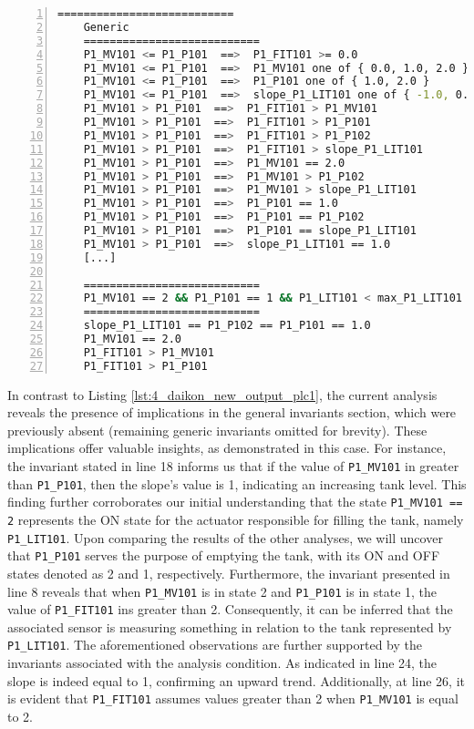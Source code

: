 \begin{lstlisting}[language=bash,numbers=left,caption={Daikon outcomes for the system configuration \texttt{P1\_MV101 == 2, P1\_P101 == 1} on \texttt{P1\_LIT101}},label=lst:4_current_system_config_analysis]
	===========================
	Generic
	===========================
	P1_MV101 <= P1_P101  ==>  P1_FIT101 >= 0.0
	P1_MV101 <= P1_P101  ==>  P1_MV101 one of { 0.0, 1.0, 2.0 }
	P1_MV101 <= P1_P101  ==>  P1_P101 one of { 1.0, 2.0 }
	P1_MV101 <= P1_P101  ==>  slope_P1_LIT101 one of { -1.0, 0.0, 1.0 }
	P1_MV101 > P1_P101  ==>  P1_FIT101 > P1_MV101
	P1_MV101 > P1_P101  ==>  P1_FIT101 > P1_P101
	P1_MV101 > P1_P101  ==>  P1_FIT101 > P1_P102
	P1_MV101 > P1_P101  ==>  P1_FIT101 > slope_P1_LIT101
	P1_MV101 > P1_P101  ==>  P1_MV101 == 2.0
	P1_MV101 > P1_P101  ==>  P1_MV101 > P1_P102
	P1_MV101 > P1_P101  ==>  P1_MV101 > slope_P1_LIT101
	P1_MV101 > P1_P101  ==>  P1_P101 == 1.0
	P1_MV101 > P1_P101  ==>  P1_P101 == P1_P102
	P1_MV101 > P1_P101  ==>  P1_P101 == slope_P1_LIT101
	P1_MV101 > P1_P101  ==>  slope_P1_LIT101 == 1.0
	[...]
	
	===========================
	P1_MV101 == 2 && P1_P101 == 1 && P1_LIT101 < max_P1_LIT101 && P1_LIT101 > min_P1_LIT101
	===========================
	slope_P1_LIT101 == P1_P102 == P1_P101 == 1.0
	P1_MV101 == 2.0
	P1_FIT101 > P1_MV101
	P1_FIT101 > P1_P101
\end{lstlisting}
In contrast to Listing \ref{lst:4_daikon_new_output_plc1}, the current analysis reveals the presence of implications in the general invariants section, which were previously absent (remaining generic invariants omitted for brevity). These implications offer valuable insights, as demonstrated in this case. For instance, the invariant stated in line 18 informs us that if the value of \texttt{P1\_MV101} in greater than \texttt{P1\_P101}, then the slope's value is 1, indicating an increasing tank level. This finding further corroborates our initial understanding that the state \texttt{P1\_MV101 == 2} represents the ON state for the actuator responsible for filling the tank, namely \texttt{P1\_LIT101}. Upon comparing the results of the other analyses, we will uncover that \texttt{P1\_P101} serves the purpose of emptying the tank, with its ON and OFF states denoted as 2 and 1, respectively.\newline 
Furthermore, the invariant presented in line 8 reveals that when \texttt{P1\_MV101} is in state 2 and \texttt{P1\_P101} is in state 1, the value of \texttt{P1\_FIT101} ins greater than 2. Consequently, it can be inferred that the associated sensor is measuring something in relation to the tank represented by \texttt{P1\_LIT101}.\newline
The aforementioned observations are further supported by the invariants associated with the analysis condition. As indicated in line 24, the slope is indeed equal to 1, confirming an upward trend. Additionally, at line 26, it is evident that \texttt{P1\_FIT101} assumes values greater than 2 when \texttt{P1\_MV101} is equal to 2.

